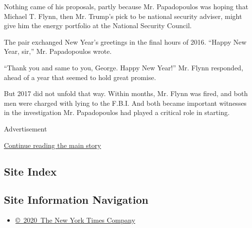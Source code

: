 Nothing came of his proposals, partly because Mr. Papadopoulos was
hoping that Michael T. Flynn, then Mr. Trump's pick to be national
security adviser, might give him the energy portfolio at the National
Security Council.

The pair exchanged New Year's greetings in the final hours of 2016.
``Happy New Year, sir,'' Mr. Papadopoulos wrote.

``Thank you and same to you, George. Happy New Year!'' Mr. Flynn
responded, ahead of a year that seemed to hold great promise.

But 2017 did not unfold that way. Within months, Mr. Flynn was fired,
and both men were charged with lying to the F.B.I. And both became
important witnesses in the investigation Mr. Papadopoulos had played a
critical role in starting.

Advertisement

\protect\hyperlink{after-bottom}{Continue reading the main story}

\hypertarget{site-index}{%
\subsection{Site Index}\label{site-index}}

\hypertarget{site-information-navigation}{%
\subsection{Site Information
Navigation}\label{site-information-navigation}}

\begin{itemize}
\tightlist
\item
  \href{https://help.nytimes3xbfgragh.onion/hc/en-us/articles/115014792127-Copyright-notice}{©~2020~The
  New York Times Company}
\end{itemize}


